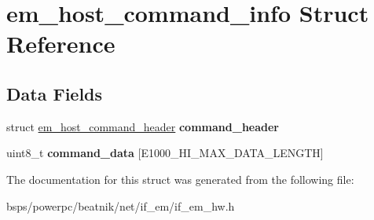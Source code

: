 \hypertarget{structem__host__command__info}{}\section{em\+\_\+host\+\_\+command\+\_\+info Struct Reference}
\label{structem__host__command__info}
\subsection*{Data Fields}
\begin{DoxyCompactItemize}
\item 
\mbox{\label{structem__host__command__info_a54a431ba8e196da191ca146419019633}} 
struct \mbox{\hyperlink{structem__host__command__header}{em\+\_\+host\+\_\+command\+\_\+header}} {\bfseries command\+\_\+header}
\item 
\mbox{\label{structem__host__command__info_a1e761120551a6e9563f823f86f4758c5}} 
uint8\+\_\+t {\bfseries command\+\_\+data} \mbox{[}E1000\+\_\+\+H\+I\+\_\+\+M\+A\+X\+\_\+\+D\+A\+T\+A\+\_\+\+L\+E\+N\+G\+TH\mbox{]}
\end{DoxyCompactItemize}


The documentation for this struct was generated from the following file\+:\begin{DoxyCompactItemize}
\item 
bsps/powerpc/beatnik/net/if\+\_\+em/if\+\_\+em\+\_\+hw.\+h\end{DoxyCompactItemize}
